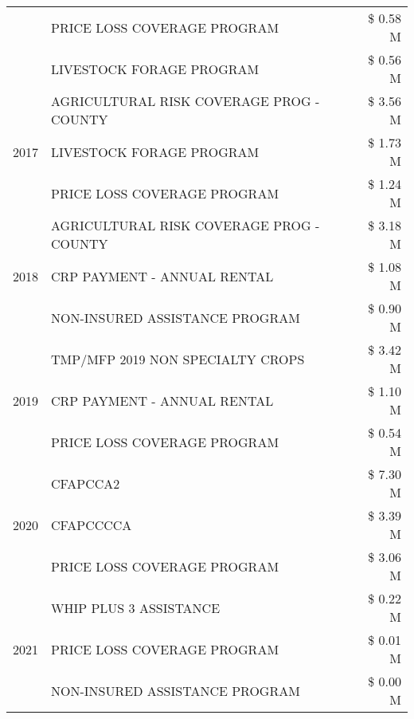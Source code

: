 \begin{tabular}{llr}
 & PRICE LOSS COVERAGE PROGRAM & \$ 0.58 M \\
 & LIVESTOCK FORAGE PROGRAM & \$ 0.56 M \\
\cline{1-3}
\multirow[t]{3}{*}{2017} & AGRICULTURAL RISK COVERAGE PROG - COUNTY & \$ 3.56 M \\
 & LIVESTOCK FORAGE PROGRAM & \$ 1.73 M \\
 & PRICE LOSS COVERAGE PROGRAM & \$ 1.24 M \\
\cline{1-3}
\multirow[t]{3}{*}{2018} & AGRICULTURAL RISK COVERAGE PROG - COUNTY & \$ 3.18 M \\
 & CRP PAYMENT - ANNUAL RENTAL & \$ 1.08 M \\
 & NON-INSURED ASSISTANCE PROGRAM & \$ 0.90 M \\
\cline{1-3}
\multirow[t]{3}{*}{2019} & TMP/MFP 2019 NON SPECIALTY CROPS & \$ 3.42 M \\
 & CRP PAYMENT - ANNUAL RENTAL & \$ 1.10 M \\
 & PRICE LOSS COVERAGE PROGRAM & \$ 0.54 M \\
\cline{1-3}
\multirow[t]{3}{*}{2020} & CFAPCCA2 & \$ 7.30 M \\
 & CFAPCCCCA & \$ 3.39 M \\
 & PRICE LOSS COVERAGE PROGRAM & \$ 3.06 M \\
\cline{1-3}
\multirow[t]{3}{*}{2021} & WHIP PLUS 3 ASSISTANCE & \$ 0.22 M \\
 & PRICE LOSS COVERAGE PROGRAM & \$ 0.01 M \\
 & NON-INSURED ASSISTANCE PROGRAM & \$ 0.00 M \\
\cline{1-3}
\bottomrule
\end{tabular}
